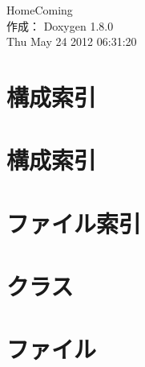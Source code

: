 \documentclass{book}
\begin{document}
\hypersetup{pageanchor=false,citecolor=blue}
\begin{titlepage}
\vspace*{7cm}
\begin{center}
{\Large Home\-Coming }\\
\vspace*{1cm}
{\large 作成： Doxygen 1.8.0}\\
\vspace*{0.5cm}
{\small Thu May 24 2012 06:31:20}\\
\end{center}
\end{titlepage}
\clearemptydoublepage
{}
\tableofcontents
\clearemptydoublepage
{}
\hypersetup{pageanchor=true,citecolor=blue}
\chapter{構成索引}

\chapter{構成索引}

\chapter{ファイル索引}

\chapter{クラス}


















\chapter{ファイル}




























\printindex
\end{document}
